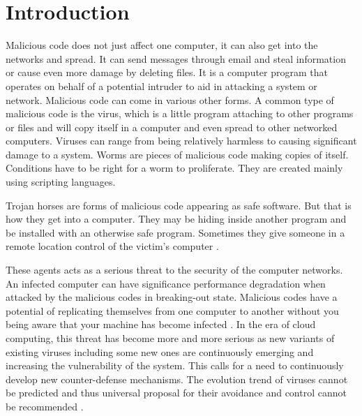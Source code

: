 \documentclass[conference]{IEEEtran}
\begin{document}
\section{Introduction}
Malicious code does not just affect one computer, it can also get into the networks and spread. It can send messages through email and steal information or cause even more damage by deleting files. It is a computer program that operates on behalf of a potential intruder to aid in attacking a system or network. Malicious code can come in various other forms. A common type of malicious code is the virus, which is a little program attaching to other programs or files and will copy itself in a computer and even spread to other networked computers. Viruses can range from being relatively harmless to causing significant damage to a system.
\indent Worms are pieces of malicious code making copies of itself. Conditions have to be right for a worm to proliferate. They are created mainly using scripting languages.

Trojan horses are forms of malicious code appearing as safe software. But that is how they get into a computer. They may be hiding inside another program and be installed with an otherwise safe program. Sometimes they give someone in a remote location control of the victim's computer \cite{goswami2012information}.

These agents acts as a serious threat to the security of the computer networks. An infected computer can have significance performance degradation when attacked by the malicious codes in breaking-out state. Malicious codes have a potential of replicating themselves from one computer to another without you being aware that your machine has become infected \cite{wang2015worm}. In the era of cloud computing, this threat has become more and more serious as new variants of existing viruses including some new ones are continuously emerging and increasing the vulnerability of the system. This calls for a need to continuously develop new counter-defense mechanisms. The evolution trend of viruses cannot be predicted and thus universal proposal for their avoidance and control cannot be recommended \cite{yang2012towards}.
\end{document}
